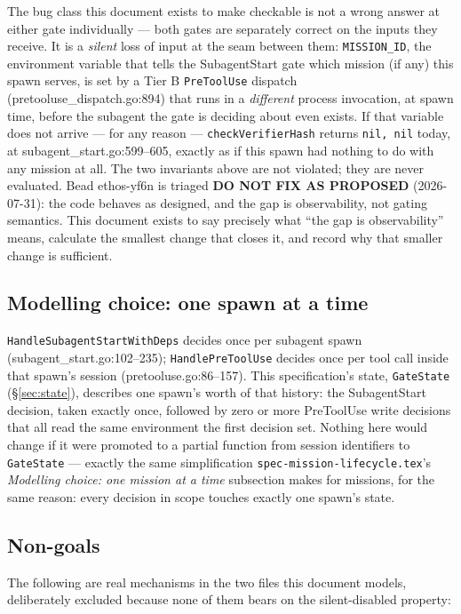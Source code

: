 \documentclass[a4paper,10pt,fleqn]{article}
\newcommand{\fpath}[1]{\texttt{#1}}
\newcommand{\field}[1]{\texttt{#1}}
\begin{document}
The bug class this document exists to make checkable is not a wrong
answer at either gate individually --- both gates are separately
correct on the inputs they receive. It is a \emph{silent} loss of
input at the seam between them: \field{MISSION\_ID}, the environment
variable that tells the SubagentStart gate which mission (if any)
this spawn serves, is set by a Tier B \fpath{PreToolUse} dispatch
(pretooluse\_dispatch.go:894) that runs in a \emph{different} process
invocation, at spawn time, before the subagent the gate is deciding
about even exists. If that variable does not arrive --- for any
reason --- \field{checkVerifierHash} returns \field{nil, nil}
today, at subagent\_start.go:599--605, exactly as if this spawn had
nothing to do with any mission at all. The two invariants above are
not violated; they are never evaluated. Bead ethos-yf6n is triaged
\textbf{DO NOT FIX AS PROPOSED} (2026-07-31): the code behaves as
designed, and the gap is observability, not gating semantics. This
document exists to say precisely what ``the gap is observability''
means, calculate the smallest change that closes it, and record why
that smaller change is sufficient.

\subsection{Modelling choice: one spawn at a time}
\label{sec:onespawn}

\field{HandleSubagentStartWithDeps} decides once per subagent
spawn (subagent\_start.go:102--235); \field{HandlePreToolUse}
decides once per tool call inside that spawn's session
(pretooluse.go:86--157). This specification's state,
\field{GateState} (\S\ref{sec:state}), describes one spawn's
worth of that history: the SubagentStart decision, taken exactly
once, followed by zero or more PreToolUse write decisions that all
read the same environment the first decision set. Nothing here would
change if it were promoted to a partial function from session
identifiers to \field{GateState} --- exactly the same simplification
\fpath{spec-mission-lifecycle.tex}'s \emph{Modelling choice: one
mission at a time} subsection makes for missions, for the same
reason: every decision in scope touches exactly one spawn's state.

\subsection{Non-goals}
\label{sec:nongoals}

The following are real mechanisms in the two files this document
models, deliberately excluded because none of them bears on the
silent-disabled property:
\end{document}
